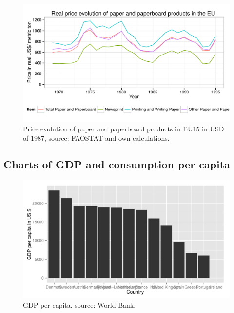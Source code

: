 \documentclass{scrartcl}\usepackage{graphicx, color}
\newenvironment{knitrout}{}{} %
\begin{document}
\begin{knitrout}
\color{fgcolor}\begin{figure}[h]


{\centering \includegraphics[width=.8\linewidth]{figure/PriceEU15} 

}

\caption[Price evolution of paper and paperboard products in EU15 in USD of 1987, source]{Price evolution of paper and paperboard products in EU15 in USD of 1987, source: FAOSTAT and own calculations.\label{fig:PriceEU15}}
\end{figure}


\end{knitrout}




\newpage
\subsection{Charts of GDP and consumption per capita}

\begin{knitrout}
\color{fgcolor}\begin{figure}[h]


{\centering \includegraphics[width=.7\linewidth]{figure/GDPPerCapita} 

}

\caption[GDP per capita]{GDP per capita. source: World Bank.\label{fig:GDPPerCapita}}
\end{figure}


\end{knitrout}
\end{document}
